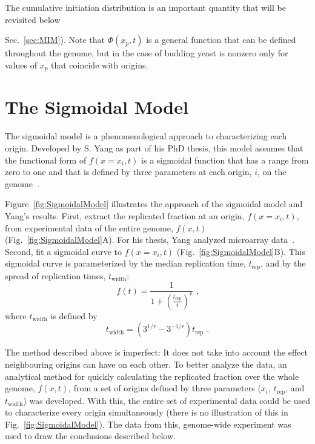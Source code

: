 		The cumulative initiation distribution is an important quantity that will be revisited below {Sec.~\ref{sec:MIM}).
		Note that $\Phi(x_p,t)$ is a general function that can be defined throughout the genome, but in the case of budding yeast is nonzero only for values of $x_p$ that coincide with origins.


	\section{The Sigmoidal Model}
	\label{sec:SigmoidalModel}
	
	The sigmoidal model is a phenomenological approach to characterizing each origin.
	Developed by S. Yang as part of his PhD thesis, this model assumes that the functional form of $f(x=x_i,t)$ is a sigmoidal function that has a range from zero to one and that is defined by three parameters at each origin, $i$, on the genome~\cite{ScottsPaper,ScottsThesis}.
	
	Figure~\ref{fig:SigmoidalModel} illustrates the approach of the sigmoidal model and Yang's results.
	First, extract the replicated fraction at an origin, $f(x=x_i,t)$, from experimental data of the entire genome, $f(x,t)$ (Fig.~\ref{fig:SigmoidalModel}A).
	For his thesis, Yang analyzed microarray data~\cite{McCuneMicroArray}.
	Second, fit a sigmoidal curve to $f(x=x_i,t)$ (Fig.~\ref{fig:SigmoidalModel}B).
	This sigmoidal curve is parameterized by the median replication time, $t_{\text{rep}}$, and by the spread of replication times, $t_{\text{width}}$:
	\begin{equation} \label{eq:SigmoidalModel}
		f(t) = {\frac{1}{1+\left({\frac{t_{\text{rep}}}{t}}\right)^r}}\text{ ,}
	\end{equation}
	where $t_{\text{width}}$ is defined by
	\begin{equation}
		t_{\text{width}} = \left(3^{1/r}-3^{-1/r}\right)t_{\text{rep}}\text{ .}
	\end{equation}
	
	The method described above is imperfect: It does not take into account the effect neighbouring origins can have on each other.
	To better analyze the data, an analytical method for quickly calculating the replicated fraction over the whole genome, $f(x,t)$, from a set of origins defined by three parameters ($x_i$, $t_{\text{rep}}$, and $t_{\text{width}}$) was developed.
	With this, the entire set of experimental data could be used to characterize every origin simultaneously (there is no illustration of this in Fig.~\ref{fig:SigmoidalModel}).
	The data from this, genome-wide experiment was used to draw the conclusions described below.
	
}
